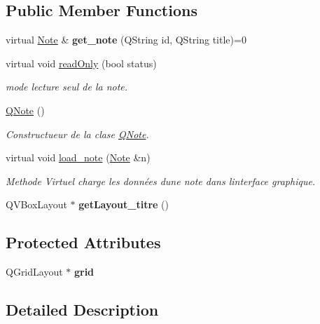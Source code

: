 \subsection*{Public Member Functions}
\begin{DoxyCompactItemize}
\item 
\mbox{\label{class_q_note_a9938dcbd69ea0f0cbc12a8faa2a38576}} 
virtual \hyperlink{class_note}{Note} \& {\bfseries get\+\_\+note} (Q\+String id, Q\+String title)=0
\item 
virtual void \hyperlink{class_q_note_ae6fb14b839acc1979b145a892d6a0a92}{read\+Only} (bool status)
\begin{DoxyCompactList}\small\item\em mode lecture seul de la note. \end{DoxyCompactList}\item 
\hyperlink{class_q_note_a4f3980466d58be3cb5e15d2e45d74840}{Q\+Note} ()
\begin{DoxyCompactList}\small\item\em Constructueur de la clase \hyperlink{class_q_note}{Q\+Note}. \end{DoxyCompactList}\item 
virtual void \hyperlink{class_q_note_adca0a8f2851fbb1c3843ca4fe7957c11}{load\+\_\+note} (\hyperlink{class_note}{Note} \&n)
\begin{DoxyCompactList}\small\item\em Methode Virtuel charge les données d\textquotesingle{}une note dans l\textquotesingle{}interface graphique. \end{DoxyCompactList}\item 
\mbox{\label{class_q_note_aa7e7772b41fe2443cf1225bf1937a4ca}} 
Q\+V\+Box\+Layout $\ast$ {\bfseries get\+Layout\+\_\+titre} ()
\end{DoxyCompactItemize}
\subsection*{Protected Attributes}
\begin{DoxyCompactItemize}
\item 
\mbox{\label{class_q_note_a126c0984d4769bd7a565e1303eac3184}} 
Q\+Grid\+Layout $\ast$ {\bfseries grid}
\end{DoxyCompactItemize}


\subsection{Detailed Description}


